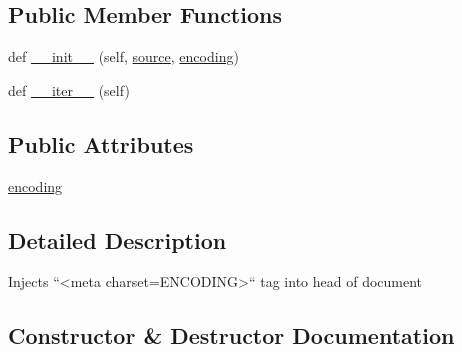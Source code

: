 \subsection*{Public Member Functions}
\begin{DoxyCompactItemize}
\item 
def \hyperlink{classpip_1_1__vendor_1_1html5lib_1_1filters_1_1inject__meta__charset_1_1Filter_a3e43e62fe974fa45e430ad941afcc8ca}{\+\_\+\+\_\+init\+\_\+\+\_\+} (self, \hyperlink{classpip_1_1__vendor_1_1html5lib_1_1filters_1_1base_1_1Filter_aedf7f8b39d6bd2b443f81db8fcc14060}{source}, \hyperlink{classpip_1_1__vendor_1_1html5lib_1_1filters_1_1inject__meta__charset_1_1Filter_a5f91f11c673dcc5e159560871eea9e8f}{encoding})
\item 
def \hyperlink{classpip_1_1__vendor_1_1html5lib_1_1filters_1_1inject__meta__charset_1_1Filter_abbe5945bb22cdc3f9b109cb06d785f7c}{\+\_\+\+\_\+iter\+\_\+\+\_\+} (self)
\end{DoxyCompactItemize}
\subsection*{Public Attributes}
\begin{DoxyCompactItemize}
\item 
\hyperlink{classpip_1_1__vendor_1_1html5lib_1_1filters_1_1inject__meta__charset_1_1Filter_a5f91f11c673dcc5e159560871eea9e8f}{encoding}
\end{DoxyCompactItemize}


\subsection{Detailed Description}
\begin{DoxyVerb}Injects ``<meta charset=ENCODING>`` tag into head of document\end{DoxyVerb}
 

\subsection{Constructor \& Destructor Documentation}
\mbox{\label{classpip_1_1__vendor_1_1html5lib_1_1filters_1_1inject__meta__charset_1_1Filter_a3e43e62fe974fa45e430ad941afcc8ca}} 
